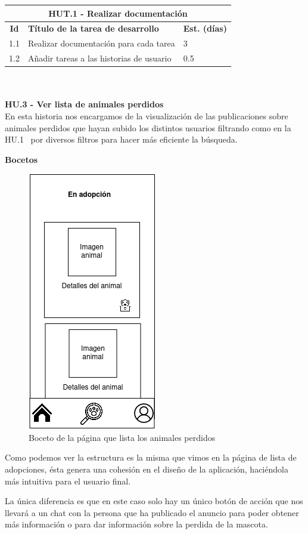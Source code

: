 \begin{tabular}{|c|p{9.5cm}|p{1cm}|}
	\hline
	\multicolumn{3}{|c|}{\textbf{HUT.1 - Realizar documentación}} \\
	\hline
	\textbf{Id} & \textbf{Título de la tarea de desarrollo} & \textbf{Est. (días)} \\
	\hline
	1.1 & Realizar documentación para cada tarea & 3 \\ \hline
	1.2 &  Añadir tareas a las historias de usuario & 0.5 \\ \hline
\end{tabular} \\ \\

\Large{\textbf{HU.3 - Ver lista de animales perdidos}} \\

En esta historia nos encargamos de la visualización de las publicaciones sobre animales perdidos que hayan subido los distintos usuarios filtrando como en la HU.1~\pageref{sec:hu1} por diversos filtros para hacer más eficiente la búsqueda.

\textbf{Bocetos}

\begin{figure}[h]
	\centering
	\includegraphics[width=0.31\linewidth]{"sprint 2/hu3/listaPerdidos"}
	\caption{Boceto de la página que lista los animales perdidos}
	\label{fig:listaperdidos}
\end{figure}

Como podemos ver la estructura es la misma que vimos en la página de lista de adopciones, ésta genera una cohesión en el diseño de la aplicación, haciéndola más intuitiva para el usuario final.

La única diferencia es que en este caso solo hay un único botón de acción que nos llevará a un chat con la persona que ha publicado el anuncio para poder obtener más información o para dar información sobre la perdida de la mascota.

